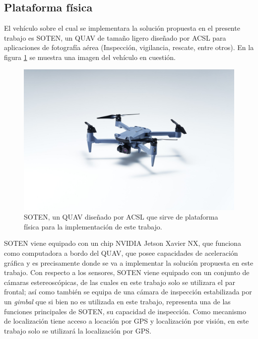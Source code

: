\subsection{Plataforma física}

El vehículo sobre el cual se implementara la solución propuesta en el presente trabajo es SOTEN, un QUAV de tamaño ligero diseñado por ACSL para aplicaciones de fotografía aérea (Inspección, vigilancia, rescate, entre otros). En la figura \ref{fig:SOTEN} se muestra una imagen del vehículo en cuestión.

\begin{figure}[H]
    \centering
    \includegraphics[scale=0.15]{partes/img/SOTEN.jpg}
    \caption[SOTEN, un QUAV diseñado por ACSL que sirve de plataforma física para la implementación de este trabajo.]{SOTEN, un QUAV diseñado por ACSL que sirve de plataforma física para la implementación de este trabajo.}
    \label{fig:SOTEN}
\end{figure}

SOTEN viene equipado con un chip NVIDIA Jetson Xavier NX, que funciona como computadora a bordo del QUAV, que posee capacidades de aceleración gráfica y es precisamente donde se va a implementar la solución propuesta en este trabajo. Con respecto a los sensores, SOTEN viene equipado con un conjunto de cámaras estereoscópicas, de las cuales en este trabajo solo se utilizara el par frontal; así como también se equipa de una cámara de inspección estabilizada por un \textit{gimbal} que si bien no es utilizada en este trabajo, representa una de las funciones principales de SOTEN, su capacidad de inspección. Como mecanismo de localización tiene acceso a locación por GPS y localización por visión, en este trabajo solo se utilizará la localización por GPS. 


